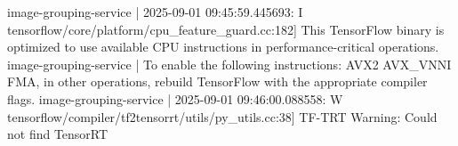 image-grouping-service  | 2025-09-01 09:45:59.445693: I tensorflow/core/platform/cpu_feature_guard.cc:182] This TensorFlow binary is optimized to use available CPU instructions in performance-critical operations.
image-grouping-service  | To enable the following instructions: AVX2 AVX_VNNI FMA, in other operations, rebuild TensorFlow with the appropriate compiler flags.
image-grouping-service  | 2025-09-01 09:46:00.088558: W tensorflow/compiler/tf2tensorrt/utils/py_utils.cc:38] TF-TRT Warning: Could not find TensorRT




















